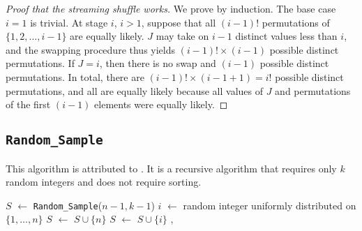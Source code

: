 \documentclass[12pt]{article}
\newcommand*\Let[2]{\State #1 $\gets$ #2}
\newcommand{\todo}[1]{{\color{red}{TO DO: \sc #1}}}
\begin{document}
\begin{proof}[Proof that the streaming shuffle works]
We prove by induction. The base case $i=1$ is trivial.
At stage $i$, $i>1$, suppose that all $(i-1)!$ permutations of $\{1, 2, \dots, i-1\}$ are equally likely.
$J$ may take on $i-1$ distinct values less than $i$, and the swapping procedure thus yields $(i-1)! \times (i-1)$
possible distinct permutations.
If $J = i$, then there is no swap and $(i-1)$ possible distinct permutations.
In total, there are $(i-1)! \times (i-1 + 1) = i!$ possible distinct permutations, and all are equally likely because
all values of $J$ and permutations of the first $(i-1)$ elements were equally likely.
\end{proof}


\subsection{\texttt{Random\_Sample}}
This algorithm is attributed to \citet{cormen_introduction_2009}.
It is a recursive algorithm that requires only $k$ random integers and does not require sorting.
\todo{prove by recursion that the method works}


\begin{algorithm}                      %
\caption{$Random\_Sample$}
\label{Random_Sample}
\begin{algorithmic}[1]               %
\Statex
{}
\Else
     \Let{$S$}{\texttt{Random\_Sample}($n-1, k-1$)}
     \Let{$i$}{random integer uniformly distributed on $\{1, \dots, n\}$} 
           \Let{$S$}{$S \cup \{n\}$}
     \Else
            \Let{$S$}{$S\cup\{i\}$}  
     \EndIf, 
\EndIf
\EndFunction
\end{algorithmic}
\end{algorithm}
\end{document}
